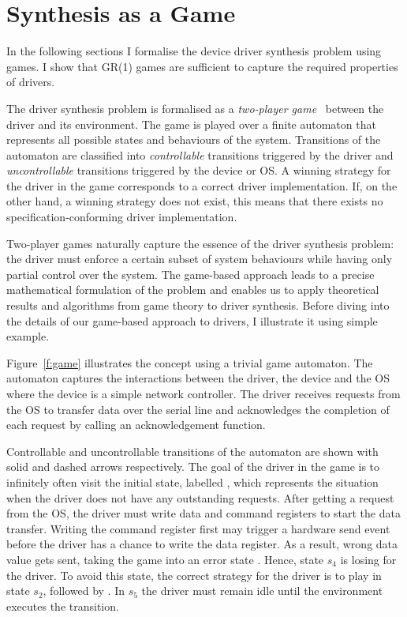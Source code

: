 \chapter{Synthesis as a Game}

In the following sections I formalise the device driver synthesis problem using games. I show that GR(1) games are sufficient to capture the required properties of drivers.

The driver synthesis problem is formalised as a \emph{two-player game}~\cite{Thomas_95} between the driver and its environment. The game is played over a finite automaton that represents all possible states and behaviours of the system. Transitions of the automaton are classified into \emph{controllable} transitions triggered by the driver and \emph{uncontrollable} transitions triggered by the device or OS. A winning strategy for the driver in the game corresponds to a correct driver implementation. If, on the other hand, a winning strategy does not exist, this means that there exists no specification-conforming driver implementation.

Two-player games naturally capture the essence of the driver synthesis problem: the driver must enforce a certain subset of system behaviours while having only partial control over the system. The game-based approach leads to a precise mathematical formulation of the problem and enables us to apply theoretical results and algorithms from game theory to driver synthesis. Before diving into the details of our game-based approach to drivers, I illustrate it using simple example.

Figure~\ref{f:game} illustrates the concept using a trivial game automaton. The automaton captures the interactions between the driver, the device and the OS where the device is a simple network controller. The driver receives requests from the OS to transfer data over the serial line and acknowledges the completion of each request by calling an acknowledgement function. 

Controllable and uncontrollable transitions of the automaton are shown with solid and dashed arrows respectively.  The goal of the driver in the game is to infinitely often visit the initial state, labelled , which represents the situation when the driver does not have any outstanding requests.  After getting a  request from the OS, the driver must write data and command registers to start the data transfer.  Writing the command register first may trigger a hardware send event before the driver has a chance to write the data register.  As a result, wrong data value gets sent, taking the game into an error state .  Hence, state $s_4$ is losing for the driver.  To avoid this state, the correct strategy for the driver is to play  in state $s_2$, followed by .  In $s_5$ the driver must remain idle until the environment executes the  transition.

